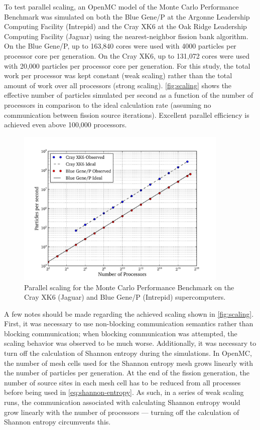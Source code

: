 To test parallel scaling, an OpenMC model of the Monte Carlo Performance
Benchmark was simulated on both the Blue Gene/P at the Argonne Leadership
Computing Facility (Intrepid) and the Cray XK6 at the Oak Ridge Leadership
Computing Facility (Jaguar) using the nearest-neighbor fission bank
algorithm. On the Blue Gene/P, up to 163,840 cores were used with 4000 particles
per processor core per generation. On the Cray XK6, up to 131,072 cores were
used with 20,000 particles per processor core per generation. For this study,
the total work per processor was kept constant (weak scaling) rather than the
total amount of work over all processors (strong scaling). \autoref{fig:scaling}
shows the effective number of particles simulated per second as a function of
the number of processors in comparison to the ideal calculation rate (assuming
no communication between fission source iterations). Excellent parallel
efficiency is achieved even above 100,000 processors.
\begin{figure}[ht]
  \centering
  \includegraphics[width=0.9\textwidth]{figures/ch3/scaling/scaling_loglog.pdf}
  \caption{Parallel scaling for the Monte Carlo Performance Benchmark on the
    Cray XK6 (Jaguar) and Blue Gene/P (Intrepid) supercomputers.}
  \label{fig:scaling}
\end{figure}

A few notes should be made regarding the achieved scaling shown in
\autoref{fig:scaling}. First, it was necessary to use non-blocking communication
semantics rather than blocking communication; when blocking communication was
attempted, the scaling behavior was observed to be much worse. Additionally, it
was necessary to turn off the calculation of Shannon entropy during the
simulations. In OpenMC, the number of mesh cells used for the Shannon entropy
mesh grows linearly with the number of particles per generation. At the end of
the fission generation, the number of source sites in each mesh cell has to be
reduced from all processes before being used in \eqref{eq:shannon-entropy}. As
such, in a series of weak scaling runs, the communication associated with
calculating Shannon entropy would grow linearly with the number of processors
--- turning off the calculation of Shannon entropy circumvents this.


